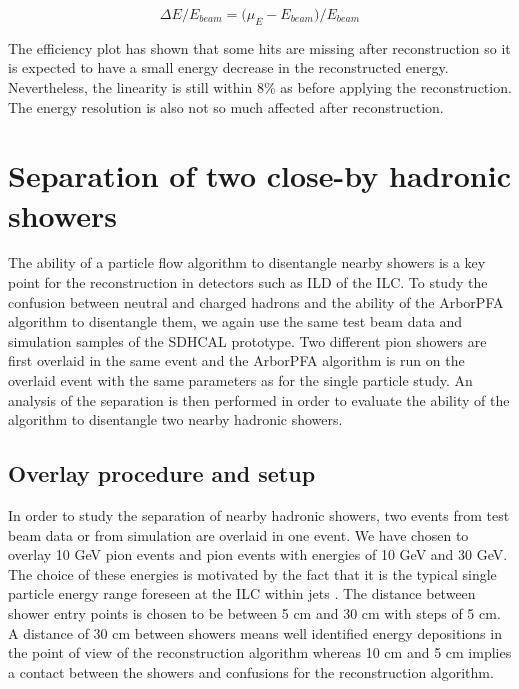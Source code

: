 \documentclass[cits]{JINST}
\begin{document}
\begin{equation}
  \Delta E/E_{beam} = \Big(\mu_{E} - E_{beam}\Big)/E_{beam}
\end{equation}

The efficiency plot has shown that some hits are missing after reconstruction so it is expected to have a small energy decrease in the reconstructed energy. Nevertheless, the linearity is still within 8\% as before applying the reconstruction. The energy resolution is also not so much affected after reconstruction.

\section{Separation of two close-by hadronic showers}

The ability of a particle flow algorithm to disentangle nearby showers is a key point for the reconstruction in detectors such as ILD of the ILC. To study the confusion between neutral and charged hadrons and the ability of the ArborPFA algorithm to disentangle them, we again use the same test beam data and simulation samples of the SDHCAL prototype. Two different pion showers are first overlaid in the same event and the ArborPFA algorithm is run on the overlaid event with the same parameters as for the single particle study. An analysis of the separation is then performed in order to evaluate the ability of the algorithm to disentangle two nearby hadronic showers.

\subsection{Overlay procedure and setup}

In order to study the separation of nearby hadronic showers, two events from test beam data or from simulation are overlaid in one event. We have chosen to overlay 10 GeV pion events and pion events with energies of 10 GeV and 30 GeV. The choice of these energies is motivated by the fact that it is the typical single particle energy range foreseen at the ILC within jets \cite{hadron-jets}. The distance between shower entry points is chosen to be between 5 cm and 30 cm with steps of 5 cm. A distance of 30 cm between showers means well identified energy depositions in the point of view of the reconstruction algorithm whereas 10 cm and 5 cm implies a contact between the showers and confusions for the reconstruction algorithm. 
\end{document}
